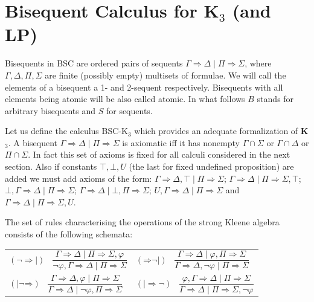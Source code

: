 \documentclass[10pt,a4paper]{article}
\theoremstyle{definition}
\newcommand{\3}{\vspace{.3in}}
\newcommand{\2}{\vspace{.2in}}
\newcommand{\1}{\vspace{.1in}}
\newcommand{\5}{\vspace{.05in}}
\begin{document}
\section{Bisequent Calculus for K$_3$ (and LP)}\label{StrongKleene}


Bisequents in BSC are ordered pairs of sequents $\Gamma\Rightarrow\Delta \mid \Pi\Rightarrow\Sigma$, where $\Gamma, \Delta, \Pi, \Sigma$ are
finite (possibly empty) multisets of formulae. We will call the elements of a bisequent a 1- and 2-sequent respectively. Bisequents with all elements being atomic will be also called atomic. In what follows $ B $ stands for
arbitrary bisequents and $ S $ for sequents.

Let us define the calculus BSC-K$_3$ which provides an adequate formalization of {\bf K$_3$}. 
A bisequent $\Gamma\Rightarrow\Delta \mid \Pi\Rightarrow\Sigma$ is axiomatic iff it has nonempty $\Gamma\cap\Sigma$ or $\Gamma\cap\Delta$ or $\Pi\cap\Sigma$. 
In fact this set of axioms is fixed for all calculi considered in the next section. Also if constants $\top, \bot, U$ (the last for fixed undefined proposition) are added we must add axioms of the form: $\Gamma\Rightarrow\Delta, \top \mid \Pi\Rightarrow\Sigma$; $\Gamma\Rightarrow\Delta \mid \Pi\Rightarrow\Sigma, \top$; $\bot, \Gamma\Rightarrow\Delta \mid \Pi\Rightarrow\Sigma$; $\Gamma\Rightarrow\Delta \mid \bot, \Pi\Rightarrow\Sigma$; $U, \Gamma\Rightarrow\Delta \mid \Pi\Rightarrow\Sigma$ and $\Gamma\Rightarrow\Delta \mid \Pi\Rightarrow\Sigma, U$.

The set of rules characterising the operations of the strong Kleene algebra consists of the following schemata:

\1

\noindent\begin{tabular}{ll}

	$(\mathord{\neg}\mathord{\Rightarrow\mid})$ \ $\dfrac{\Gamma
		\Rightarrow \Delta \mid \Pi\Rightarrow\Sigma, \varphi}{\neg\varphi, \Gamma \Rightarrow \Delta \mid \Pi\Rightarrow\Sigma}$ &
	$(\mathord{\Rightarrow}\mathord{\neg\mid})$ \ $\dfrac{\Gamma
		\Rightarrow \Delta \mid \varphi, \Pi\Rightarrow\Sigma}{\Gamma
		\Rightarrow \Delta, \neg\varphi \mid \Pi\Rightarrow\Sigma}$\\[16pt]
	
	$(\mathord{\mid\neg}\mathord{\Rightarrow})$ \ $\dfrac{\Gamma
		\Rightarrow \Delta, \varphi \mid \Pi\Rightarrow\Sigma}{\Gamma \Rightarrow \Delta \mid \neg\varphi, \Pi\Rightarrow\Sigma}$ &
	$(\mathord{\mid\Rightarrow}\mathord{\neg})$ \ $\dfrac{\varphi, \Gamma
		\Rightarrow \Delta \mid \Pi\Rightarrow\Sigma}{\Gamma
		\Rightarrow \Delta \mid \Pi\Rightarrow\Sigma, \neg\varphi}$\\[16pt]
\end{tabular}
	
\end{document}
